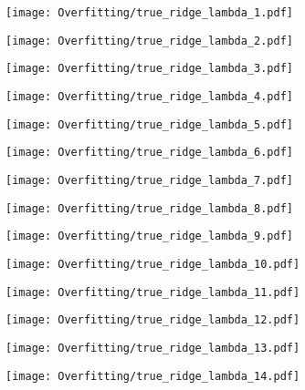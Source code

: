 \documentclass[xcolor=pdftex,dvipsnames,table]{beamer}
\begin{document}
\frame
{
	\begin{center}
		\texttt{[image: Overfitting/true\_ridge\_lambda\_1.pdf]}
	\end{center}
}
\frame
{
	\begin{center}
		\texttt{[image: Overfitting/true\_ridge\_lambda\_2.pdf]}
	\end{center}
}
\frame
{
	\begin{center}
		\texttt{[image: Overfitting/true\_ridge\_lambda\_3.pdf]}
	\end{center}
}
\frame
{
	\begin{center}
		\texttt{[image: Overfitting/true\_ridge\_lambda\_4.pdf]}
	\end{center}
}
\frame
{
	\begin{center}
		\texttt{[image: Overfitting/true\_ridge\_lambda\_5.pdf]}
	\end{center}
}
\frame
{
	\begin{center}
		\texttt{[image: Overfitting/true\_ridge\_lambda\_6.pdf]}
	\end{center}
}
\frame
{
	\begin{center}
		\texttt{[image: Overfitting/true\_ridge\_lambda\_7.pdf]}
	\end{center}
}
\frame
{
	\begin{center}
		\texttt{[image: Overfitting/true\_ridge\_lambda\_8.pdf]}
	\end{center}
}
\frame
{
	\begin{center}
		\texttt{[image: Overfitting/true\_ridge\_lambda\_9.pdf]}
	\end{center}
}
\frame
{
	\begin{center}
		\texttt{[image: Overfitting/true\_ridge\_lambda\_10.pdf]}
	\end{center}
}
\frame
{
	\begin{center}
		\texttt{[image: Overfitting/true\_ridge\_lambda\_11.pdf]}
	\end{center}
}
\frame
{
	\begin{center}
		\texttt{[image: Overfitting/true\_ridge\_lambda\_12.pdf]}
	\end{center}
}
\frame
{
	\begin{center}
		\texttt{[image: Overfitting/true\_ridge\_lambda\_13.pdf]}
	\end{center}
}
\frame
{
	\begin{center}
		\texttt{[image: Overfitting/true\_ridge\_lambda\_14.pdf]}
	\end{center}
}
\end{document}
